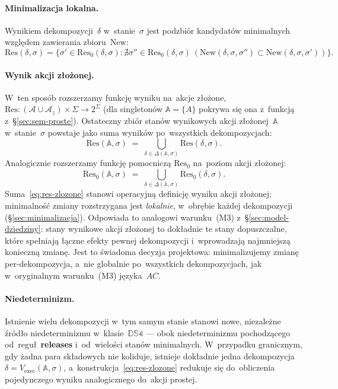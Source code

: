 \documentclass[11pt,a4paper]{article}
\newcommand{\releases}{\textbf{releases}}
\theoremstyle{definition}
\begin{document}
\paragraph{Minimalizacja lokalna.}
Wynikiem dekompozycji~$\delta$ w~stanie~$\sigma$ jest podzbiór
kandydatów minimalnych względem zawierania zbioru~$\mathrm{New}$:
\[
  \mathrm{Res}(\delta,\sigma)
  = \{\sigma' \in \mathrm{Res}_0(\delta,\sigma) :
    \nexists \sigma'' \in \mathrm{Res}_0(\delta,\sigma)\
    (\mathrm{New}(\delta,\sigma,\sigma'') \subset
     \mathrm{New}(\delta,\sigma,\sigma'))\}.
\]

\paragraph{Wynik akcji złożonej.}
W~ten sposób rozszerzamy funkcję wyniku na~akcje złożone,
$\mathrm{Res} : (\mathcal{A} \cup \mathcal{A}_z) \times \Sigma \to 2^{\Sigma}$
(dla singletonów $\mathbb{A}=\{A\}$ pokrywa się ona z~funkcją z~\S\ref{sec:sem-proste}).
Ostateczny zbiór stanów wynikowych akcji złożonej~$\mathbb{A}$
w~stanie~$\sigma$ powstaje jako suma wyników po~wszystkich dekompozycjach:
\begin{equation}
  \label{eq:res-zlozone}
  \mathrm{Res}(\mathbb{A},\sigma)
  \;=\; \bigcup_{\delta \in \Delta(\mathbb{A},\sigma)}
        \mathrm{Res}(\delta,\sigma).
\end{equation}
Analogicznie rozszerzamy funkcję pomocniczą $\mathrm{Res}_0$ na~poziom
akcji złożonej:
\[
  \mathrm{Res}_0(\mathbb{A},\sigma)
    \;=\; \bigcup_{\delta \in \Delta(\mathbb{A},\sigma)}
          \mathrm{Res}_0(\delta,\sigma).
\]
Suma~\eqref{eq:res-zlozone} stanowi operacyjną definicję wyniku akcji złożonej;
minimalność zmiany rozstrzygana jest \emph{lokalnie}, w~obrębie każdej dekompozycji
(\S\ref{sec:minimalizacja}). Odpowiada to analogowi warunku~(M3) z~\S\ref{sec:model-dziedziny}:
stany wynikowe akcji złożonej to dokładnie te stany dopuszczalne, które spełniają
łączne efekty pewnej dekompozycji i~wprowadzają najmniejszą konieczną zmianę.
Jest to świadoma decyzja projektowa: minimalizujemy zmianę per-dekompozycja, a~nie
globalnie po~wszystkich dekompozycjach, jak w~oryginalnym warunku~(M3) języka~$AC$.

\paragraph{Niedeterminizm.}
Istnienie wielu dekompozycji w~tym samym stanie stanowi nowe, niezależne
źródło niedeterminizmu w~klasie~$\mathbb{DS4}$ --- obok niedeterminizmu
pochodzącego od~reguł~\releases{} i~od~wielości stanów minimalnych.
W~przypadku granicznym, gdy żadna para składowych nie koliduje,
istnieje dokładnie jedna dekompozycja $\delta = V_{\mathrm{exec}}(\mathbb{A},\sigma)$,
a~konstrukcja~\eqref{eq:res-zlozone} redukuje się do~obliczenia
pojedynczego wyniku analogicznego do~akcji prostej.
\end{document}
